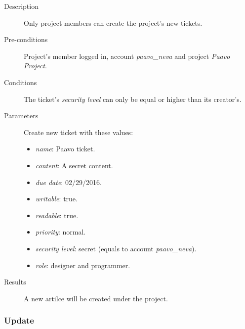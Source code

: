 \begin{description}
\item[Description] Only project members can create the project's new tickets.
\item[Pre-conditions] Project's member logged in, \eg account \emph{paavo\_neva} and project \emph{Paavo Project}.
\item[Conditions] The ticket's \emph{security level} can only be equal or higher than its creator's.
\item[Parameters] Create new ticket with these values:
\begin{itemize}
\item \emph{name}: Paavo ticket.
\item \emph{content}: A secret content.
\item \emph{due date}: 02/29/2016.
\item \emph{writable}: true.
\item \emph{readable}: true.
\item \emph{priority}: normal.
\item \emph{security level}: secret (equals to account \emph{paavo\_neva}).
\item \emph{role}: designer and programmer.
\end{itemize}
\item[Results] A new artilce will be created under the project.
\end{description}

\subsubsection{Update}
\label{ch:result:user_guide:ticket:update}

